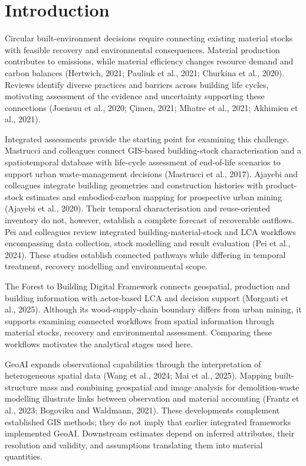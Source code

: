 
\section{Introduction}
Circular built-environment decisions require connecting existing material stocks with feasible recovery and environmental consequences. Material production contributes to emissions, while material efficiency changes resource demand and carbon balances (Hertwich, 2021; Pauliuk et al., 2021; Churkina et al., 2020). Reviews identify diverse practices and barriers across building life cycles, motivating assessment of the evidence and uncertainty supporting these connections (Joensuu et al., 2020; Çimen, 2021; Mhatre et al., 2021; Akhimien et al., 2021).

Integrated assessments provide the starting point for examining this challenge. Mastrucci and colleagues connect GIS-based building-stock characterisation and a spatiotemporal database with life-cycle assessment of end-of-life scenarios to support urban waste-management decisions (Mastrucci et al., 2017). Ajayebi and colleagues integrate building geometries and construction histories with product-stock estimates and embodied-carbon mapping for prospective urban mining (Ajayebi et al., 2020). Their temporal characterisation and reuse-oriented inventory do not, however, establish a complete forecast of recoverable outflows. Pei and colleagues review integrated building-material-stock and LCA workflows encompassing data collection, stock modelling and result evaluation (Pei et al., 2024). These studies establish connected pathways while differing in temporal treatment, recovery modelling and environmental scope.

The Forest to Building Digital Framework connects geospatial, production and building information with actor-based LCA and decision support (Morganti et al., 2025). Although its wood-supply-chain boundary differs from urban mining, it supports examining connected workflows from spatial information through material stocks, recovery and environmental assessment. Comparing these workflows motivates the analytical stages used here.

GeoAI expands observational capabilities through the interpretation of heterogeneous spatial data (Wang et al., 2024; Mai et al., 2025). Mapping built-structure mass and combining geospatial and image analysis for demolition-waste modelling illustrate links between observation and material accounting (Frantz et al., 2023; Bogoviku and Waldmann, 2021). These developments complement established GIS methods; they do not imply that earlier integrated frameworks implemented GeoAI. Downstream estimates depend on inferred attributes, their resolution and validity, and assumptions translating them into material quantities.

